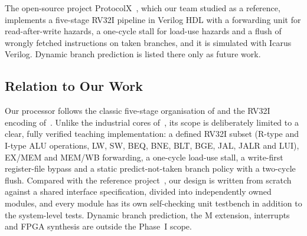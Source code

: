 The open-source project ProtocolX~\cite{ym_protocolx_repo}, which our team
studied as a reference, implements a five-stage RV32I pipeline in Verilog HDL
with a forwarding unit for read-after-write hazards, a one-cycle stall for
load-use hazards and a flush of wrongly fetched instructions on taken branches,
and it is simulated with Icarus Verilog. Dynamic branch prediction is listed
there only as future work.

\subsection{Relation to Our Work}
Our processor follows the classic five-stage organisation of
\cite{ym_patterson_cod_riscv,ym_harris_ddca_riscv} and the RV32I encoding
of~\cite{ym_riscv_spec}. Unlike the industrial cores
of~\cite{ym_gautschi_ri5cy,ym_schiavone_ulp,ym_asanovic_rocket,ym_celio_boom},
its scope is deliberately limited to a clear, fully verified teaching
implementation: a defined RV32I subset (R-type and I-type ALU operations, LW,
SW, BEQ, BNE, BLT, BGE, JAL, JALR and LUI), EX/MEM and MEM/WB forwarding, a
one-cycle load-use stall, a write-first register-file bypass and a static
predict-not-taken branch policy with a two-cycle flush. Compared with the
reference project~\cite{ym_protocolx_repo}, our design is written from scratch
against a shared interface specification, divided into independently owned
modules, and every module has its own self-checking unit testbench in addition
to the system-level tests. Dynamic branch prediction, the M extension,
interrupts and FPGA synthesis are outside the Phase~I scope.

